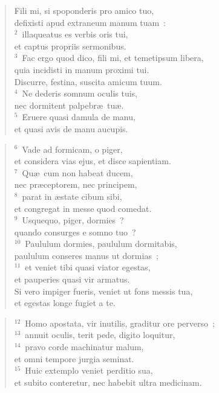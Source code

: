 \begin{flushleft}\begin{verse}\vspace{-19pt}Fili mi, si spoponderis pro amico tuo,\\ defixisti apud extraneum manum tuam~:\\
${}^{2}$~illaqueatus es verbis oris tui,\\ et captus propriis sermonibus.\\
${}^{3}$~Fac ergo quod dico, fili mi, et temetipsum libera,\\ quia incidisti in manum proximi tui.\\ Discurre, festina, suscita amicum tuum.\\
${}^{4}$~Ne dederis somnum oculis tuis,\\ nec dormitent palpebr\ae\ tu\ae .\\
${}^{5}$~Eruere quasi damula de manu,\\ et quasi avis de manu aucupis.\end{verse}\end{flushleft}


\begin{flushleft}\begin{verse}${}^{6}$~Vade ad formicam, o piger,\\ et considera vias ejus, et disce sapientiam.\\
${}^{7}$~Qu\ae\ cum non habeat ducem,\\ nec pr\ae ceptorem, nec principem,\\
${}^{8}$~parat in \ae state cibum sibi,\\ et congregat in messe quod comedat.\\
${}^{9}$~Usquequo, piger, dormies~?\\ quando consurges e somno tuo~?\\
${}^{10}$~Paululum dormies, paululum dormitabis,\\ paululum conseres manus ut dormias~;\\
${}^{11}$~et veniet tibi quasi viator egestas,\\ et pauperies quasi vir armatus.\\ Si vero impiger fueris, veniet ut fons messis tua,\\ et egestas longe fugiet a te.\end{verse}\end{flushleft}


\begin{flushleft}\begin{verse}${}^{12}$~Homo apostata, vir inutilis, graditur ore perverso~;\\
${}^{13}$~annuit oculis, terit pede, digito loquitur,\\
${}^{14}$~pravo corde machinatur malum,\\ et omni tempore jurgia seminat.\\
${}^{15}$~Huic extemplo veniet perditio sua,\\ et subito conteretur, nec habebit ultra medicinam.\end{verse}\end{flushleft}


